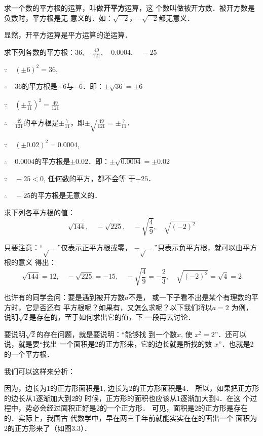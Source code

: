 求一个数的平方根的运算，叫做\textbf{开平方}运算，这
个数叫做被开方数．被开方数是负数时，平方根是无
意义的．如：$\sqrt{-2}$，$-\sqrt{-2}$都无意义．

显然，开平方运算是平方运算的逆运算．

\begin{example}
    求下列各数的平方根：$36,\quad \frac{49}{121},\quad 0.0004,\quad -25$
\end{example}

\begin{solution}
$\because\quad (\pm 6)^2=36$,

$\therefore\quad $36的平方根是$+6$与$-6$．即：$\pm\sqrt{36}=\pm 6$

$\because \quad \left(\pm \frac{7}{11}\right)^2=\frac{49}{121}$

$\therefore\quad \frac{49}{121}$的平方根是$\pm\frac{7}{11}$，即$\pm\sqrt{\frac{49}{121}}=\pm\frac{7}{11}$．

$\because\quad (\pm 0.02)^2=0.0004$,

$\therefore\quad $0.0004的平方根是$\pm 0.02$．即：$\pm\sqrt{0.0004}=\pm 0.02$

$\because\quad -25<0$, 任何数的平方，都不会等
于$-25$．

$\therefore\quad -25$的平方根是无意义的．
\end{solution}

\begin{example}
    求下列各平方根的值：
    \[\sqrt{144},\quad -\sqrt{225},\quad -\sqrt{\frac{4}{9}},\quad \sqrt{(-2)^2}   \]
\end{example}

\begin{solution}
    只要注意：“$\sqrt{\quad}$”仅表示正平方根或零，
    $-\sqrt{\quad}$”只表示负平方根，就可以由平方根的意义
得出：
\[\sqrt{144}=12,\quad -\sqrt{225}=-15,\quad -\sqrt{\frac{4}{9}}=-\frac{2}{3},\quad \sqrt{(-2)^2}=\sqrt{4}=2   \]
\end{solution}
    

也许有的同学会问：要是遇到被开方数$a$不是，
或一下子看不出是某个有理数的平方时，它是否还有
平方根呢？如果有，又怎么求呢？以下我们将以$a=2$
为例，说明$\sqrt{2}$是存在的，至于如何求出它的值，下
一段再去讨论．

要说明$\sqrt{2}$的存在问题，就是要说明：“能够找
到一个数$x$, 使
$x^2=2$”．还可以说，就是要“找出
一个面积是2的正方形来，它的边长就是所找的数
$x$”．也就是2的一个平方根．

我们可以这样来分析：

因为，边长为1的正方形面积是1,
边长为2的正方形面积是4．
所以，如果把正方形的边长从1逐渐加大到2的
时候，正方形的面积也应该从1逐渐加大到4．在这
个过程中，势必会经过面积正好是2的一个正方形．
可见，面积是2的正方形是存在的．实际上，我国古
代数学中，早在两三千年前就能实实在在的画出一个
面积为2的正方形来了（如图3.3）．



